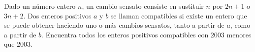 Dado un número entero $n$, un cambio sensato consiste en sustituir $n$ por $2n+1$ o $3n+2$. Dos enteros positivos $a$ y $b$ se llaman compatibles si existe un entero que se puede obtener haciendo uno o más cambios sensatos, tanto a partir de $a$, como a partir de $b$. Encuentra todos los enteros positivos compatibles con $2003$ menores que $2003$.